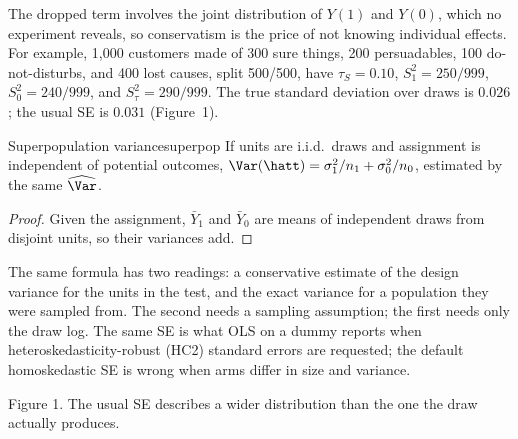\documentclass[11pt]{article}
\begin{document}
The dropped term involves the joint distribution of $Y(1)$ and $Y(0)$, which no experiment reveals, so
conservatism is the price of not knowing individual effects. For example, 1{,}000 customers made of 300 sure
things, 200 persuadables, 100 do-not-disturbs, and 400 lost causes, split 500/500, have $\tau_S = 0.10$,
$S_1^2 = 250/999$, $S_0^2 = 240/999$, and $S_\tau^2 = 290/999$. The true standard deviation over draws is
$0.026$; the usual SE is $0.031$ (Figure~1).

\begin{prop}{Superpopulation variance}{superpop}
If units are i.i.d.\ draws and assignment is independent of potential outcomes,
$\Var(\hatt) = \sigma_1^2/n_1 + \sigma_0^2/n_0$, estimated by the same $\widehat\Var$.
\end{prop}
\begin{proof}
Given the assignment, $\bar Y_1$ and $\bar Y_0$ are means of independent draws from disjoint units, so their
variances add.
\end{proof}

The same formula has two readings: a conservative estimate of the design variance for the units in the test, and
the exact variance for a population they were sampled from. The second needs a sampling assumption; the
first needs only the draw log. The same SE is what OLS on a dummy reports when heteroskedasticity-robust
(HC2) standard errors are requested; the default homoskedastic SE is wrong when arms differ in size and
variance.

\begin{center}

\small Figure 1. The usual SE describes a wider distribution than the one the draw actually produces.
\end{center}
\end{document}
